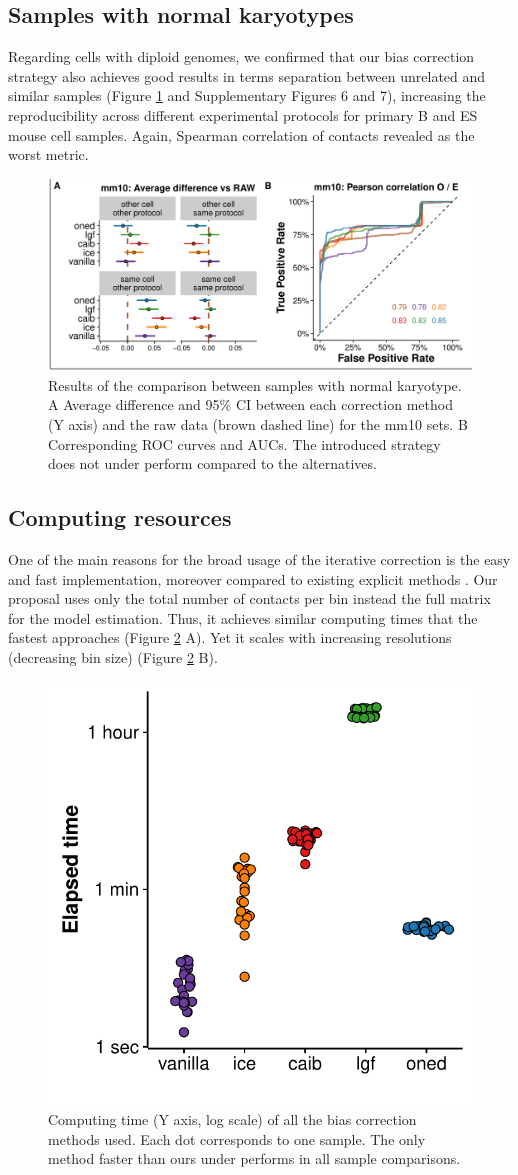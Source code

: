 \documentclass{bioinfo}
\begin{document}
\subsection{Samples with normal karyotypes}

Regarding cells with diploid genomes, we confirmed that our bias correction strategy also achieves good results in terms separation between unrelated and similar samples (Figure \ref{fig:normal} and Supplementary Figures 6 and 7), increasing the reproducibility across different experimental protocols for primary B and ES mouse cell samples. Again, Spearman correlation of contacts revealed as the worst metric.

\begin{figure}
	\centerline{\includegraphics[width=.50\textwidth]{img/correlation_normal_figure4.pdf}}
	\caption{
		Results of the comparison between samples with normal karyotype. A Average difference and 95\% CI between each correction method (Y axis) and the raw data (brown dashed line) for the mm10 sets. B Corresponding ROC curves and AUCs. The introduced strategy does not under perform compared to the alternatives.
	}\label{fig:normal}
\end{figure}

\subsection{Computing resources}

One of the main reasons for the broad usage of the iterative correction \citep{imakaev2012iterative} is the easy and fast implementation, moreover compared to existing explicit methods \citep{servant2012hitc}. Our proposal uses only the total number of contacts per bin instead the full matrix for the model estimation. Thus, it achieves similar computing times that the fastest approaches (Figure \ref{fig:times} A). Yet it scales with increasing resolutions (decreasing bin size) (Figure \ref{fig:times} B).

\begin{figure}
	\centerline{\includegraphics[width=.35\textwidth]{img/times_sina_figure5.pdf}}
	\caption{
		Computing time (Y axis, log scale) of all the bias correction methods used. Each dot corresponds to one sample. The only method faster than ours under performs in all sample comparisons.
	}\label{fig:times}
\end{figure}
\end{document}
